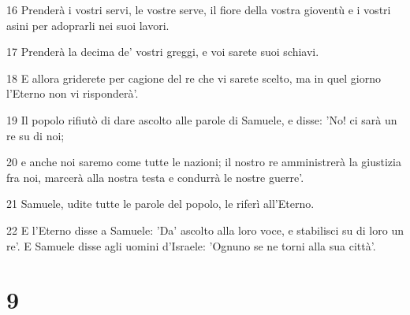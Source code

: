 \par 16 Prenderà i vostri servi, le vostre serve, il fiore della vostra gioventù e i vostri asini per adoprarli nei suoi lavori.
\par 17 Prenderà la decima de' vostri greggi, e voi sarete suoi schiavi.
\par 18 E allora griderete per cagione del re che vi sarete scelto, ma in quel giorno l'Eterno non vi risponderà'.
\par 19 Il popolo rifiutò di dare ascolto alle parole di Samuele, e disse: 'No! ci sarà un re su di noi;
\par 20 e anche noi saremo come tutte le nazioni; il nostro re amministrerà la giustizia fra noi, marcerà alla nostra testa e condurrà le nostre guerre'.
\par 21 Samuele, udite tutte le parole del popolo, le riferì all'Eterno.
\par 22 E l'Eterno disse a Samuele: 'Da' ascolto alla loro voce, e stabilisci su di loro un re'. E Samuele disse agli uomini d'Israele: 'Ognuno se ne torni alla sua città'.

\chapter{9}

